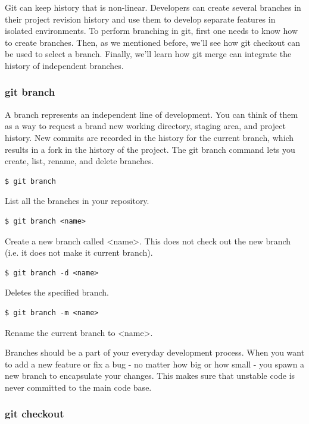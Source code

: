 \documentclass{article}
\begin{document}
Git can keep history that is non-linear. Developers can create several
branches in their project revision history and use them to develop
separate features in isolated environments. 
To perform branching in git, first one needs to know how to create branches. 
Then, as we mentioned before, we'll see how git checkout can be used to
select a branch. Finally, we'll learn how git merge can integrate the
history of independent branches.

\subsubsection*{git branch}

A branch represents an independent line of development.
 You can think of them as a
way to request a brand new working directory, staging area, and
project history. New commits are recorded in the history for the
current branch, which results in a fork in the history of the
project. The git branch command lets you create, list, rename, and delete
branches.

\begin{lstlisting}
$ git branch
\end{lstlisting}

List all the branches in your repository.

\begin{lstlisting}
$ git branch <name>
\end{lstlisting}

Create a new branch called <name>. This does not check out the new
branch (i.e. it does not make it current branch).

\begin{lstlisting}
$ git branch -d <name>
\end{lstlisting}

Deletes the specified branch.

\begin{lstlisting}
$ git branch -m <name>
\end{lstlisting}

Rename the current branch to <name>.

 Branches should be a part of your everyday development
 process. When you want to add a new feature or fix a bug - no matter
 how big or how small - you spawn a new branch to encapsulate your
 changes. This makes sure that unstable code is never committed to the
 main code base.

\subsubsection*{git checkout}
\end{document}
